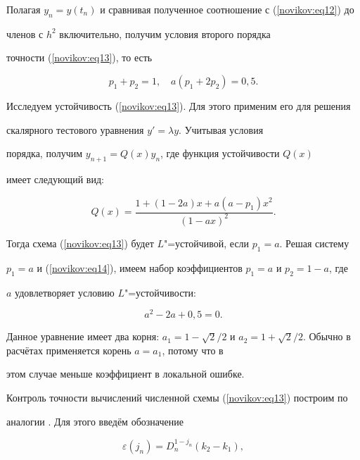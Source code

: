 Полагая $y_n=y(t_n)$ и сравнивая полученное соотношение с (\ref{novikov:eq12}) до

членов с $h^2$ включительно, получим условия второго порядка

точности (\ref{novikov:eq13}), то есть

\begin{equation}

\label{novikov:eq14}

p_1 +p_2=1,\quad a(p_1+2p_2)=0{,}5.

\end{equation}

Исследуем устойчивость (\ref{novikov:eq13}). Для этого применим его для решения

скалярного тестового уравнения $y'=\lambda y$. Учитывая условия

порядка, получим $y_{n+1}=Q(x)y_n$, где функция устойчивости $Q(x)$

имеет следующий вид:

\begin{equation*}

Q(x)=\frac{1+(1-2a)x+a(a-p_1)x^2}{(1-ax)^2}.

\end{equation*}

Тогда схема (\ref{novikov:eq13}) будет $L$"=устойчивой, если $p_1=a$. Решая систему

$p_1=a$ и (\ref{novikov:eq14}), имеем набор коэффициентов $p_1=a$ и $p_2=1-a$, где

$a$ удовлетворяет условию $L$"=устойчивости:

\begin{equation*}

a^2-2a+0{,}5=0.

\end{equation*}

Данное уравнение имеет два корня: $a_1=1-\sqrt {2}/2$ и $a_2=1+\sqrt

{2}/2$. Обычно в расчётах применяется корень $a=a_1$, потому что в

этом случае меньше коэффициент в локальной ошибке.



Контроль точности вычислений численной схемы (\ref{novikov:eq13}) построим по

аналогии \cite{Novikov:NovNov}. Для этого введём обозначение

\begin{equation}

\label{novikov:eq15}

\varepsilon(j_n)=D_n^{1-j_n}(k_2-k_1),

\end{equation}

